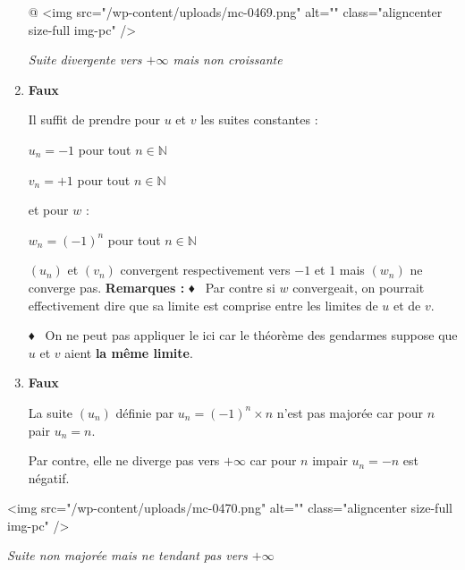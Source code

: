 \begin{corrige}
\begin{enumerate}
\begin{center}
\end{center}@
          <img src="/wp-content/uploads/mc-0469.png" alt="" class="aligncenter size-full  img-pc" />
          \begin{center}\textit{Suite divergente vers $+\infty $ mais non croissante}\end{center}
          \item
          \textbf{Faux}
\par
          Il suffit de prendre pour $u$ et $v$ les suites constantes :
          \par
          $u_{n}=-1$ pour tout $n \in  \mathbb{N}$
          \par
          $v_{n}=+1$ pour tout $n \in  \mathbb{N}$
          \par
          et pour $w$ :
          \par
          $w_{n}=\left(-1\right)^{n}$ pour tout $n \in  \mathbb{N}$
          \par
          $\left(u_{n}\right)$ et $\left(v_{n}\right)$ convergent respectivement vers $-1$ et $1$ mais $\left(w_{n}\right)$ ne converge pas.
          \textbf{Remarques :}
          ♦  Par contre si $w$ convergeait, on pourrait effectivement dire que sa limite est comprise entre les limites de $u$ et de $v$.
          \par
          ♦  On ne peut pas appliquer le  ici car le théorème des gendarmes suppose que $u$ et $v$ aient \textbf{la même limite}.
          \item
          \textbf{Faux}
\par
          La suite $\left(u_{n}\right)$ définie par $u_{n}=\left(-1\right)^{n}\times n$ n'est pas majorée car pour $n$ pair $u_{n}=n$.
          \par
          Par contre, elle ne diverge pas vers $+\infty $ car pour $n$ impair  $u_{n}=-n$ est négatif.
     \end{enumerate}
     <img src="/wp-content/uploads/mc-0470.png" alt="" class="aligncenter size-full  img-pc" />
     \begin{center}\textit{Suite non majorée mais ne tendant pas vers $+\infty $}\end{center}
\end{corrige}
